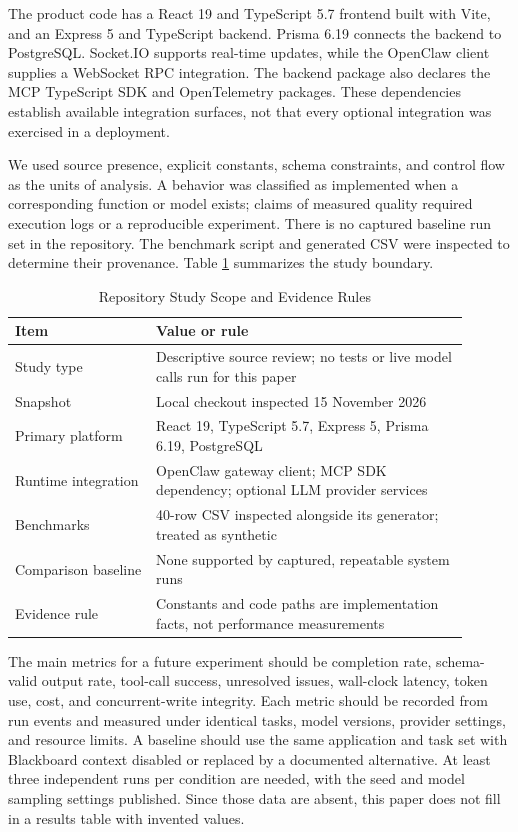 \documentclass[12pt,onecolumn,draftclsnofoot]{IEEEtran}
\begin{document}
The product code has a React 19 and TypeScript 5.7 frontend built with Vite, and an Express 5 and TypeScript backend. Prisma 6.19 connects the backend to PostgreSQL. Socket.IO supports real-time updates, while the OpenClaw client supplies a WebSocket RPC integration. The backend package also declares the MCP TypeScript SDK and OpenTelemetry packages. These dependencies establish available integration surfaces, not that every optional integration was exercised in a deployment.

We used source presence, explicit constants, schema constraints, and control flow as the units of analysis. A behavior was classified as implemented when a corresponding function or model exists; claims of measured quality required execution logs or a reproducible experiment. There is no captured baseline run set in the repository. The benchmark script and generated CSV were inspected to determine their provenance. Table \ref{tab:study-settings} summarizes the study boundary.

\begin{table}[t]
\centering
\caption{Repository Study Scope and Evidence Rules}
\label{tab:study-settings}
\small
\begin{tabular}{@{}p{0.28\linewidth}p{0.62\linewidth}@{}}
\toprule
\textbf{Item} & \textbf{Value or rule} \\
\midrule
Study type & Descriptive source review; no tests or live model calls run for this paper \\
Snapshot & Local checkout inspected 15 November 2026 \\
Primary platform & React 19, TypeScript 5.7, Express 5, Prisma 6.19, PostgreSQL \\
Runtime integration & OpenClaw gateway client; MCP SDK dependency; optional LLM provider services \\
Benchmarks & 40-row CSV inspected alongside its generator; treated as synthetic \\
Comparison baseline & None supported by captured, repeatable system runs \\
Evidence rule & Constants and code paths are implementation facts, not performance measurements \\
\bottomrule
\end{tabular}
\end{table}

The main metrics for a future experiment should be completion rate, schema-valid output rate, tool-call success, unresolved issues, wall-clock latency, token use, cost, and concurrent-write integrity. Each metric should be recorded from run events and measured under identical tasks, model versions, provider settings, and resource limits. A baseline should use the same application and task set with Blackboard context disabled or replaced by a documented alternative. At least three independent runs per condition are needed, with the seed and model sampling settings published. Since those data are absent, this paper does not fill in a results table with invented values.
\end{document}
